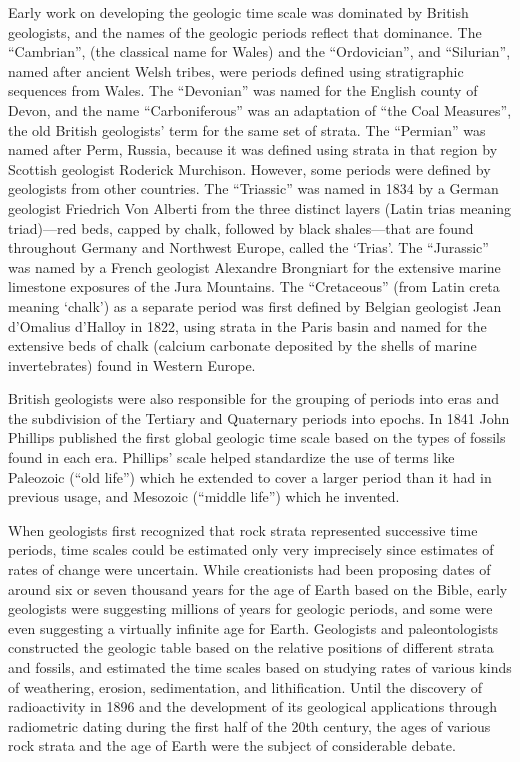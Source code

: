 \documentclass[]{book}
\theoremstyle{definition}
\theoremstyle{definition}
\theoremstyle{definition}
\theoremstyle{remark}
\begin{document}
\begin{enumerate}
Early work on developing the geologic time scale was dominated by
British geologists, and the names of the geologic periods reflect that
dominance. The ``Cambrian'', (the classical name for Wales) and the
``Ordovician'', and ``Silurian'', named after ancient Welsh tribes, were
periods defined using stratigraphic sequences from Wales. The
``Devonian'' was named for the English county of Devon, and the name
``Carboniferous'' was an adaptation of ``the Coal Measures'', the old
British geologists' term for the same set of strata. The ``Permian'' was
named after Perm, Russia, because it was defined using strata in that
region by Scottish geologist Roderick Murchison. However, some periods
were defined by geologists from other countries. The ``Triassic'' was
named in 1834 by a German geologist Friedrich Von Alberti from the three
distinct layers (Latin trias meaning triad)---red beds, capped by chalk,
followed by black shales---that are found throughout Germany and
Northwest Europe, called the `Trias'. The ``Jurassic'' was named by a
French geologist Alexandre Brongniart for the extensive marine limestone
exposures of the Jura Mountains. The ``Cretaceous'' (from Latin creta
meaning `chalk') as a separate period was first defined by Belgian
geologist Jean d'Omalius d'Halloy in 1822, using strata in the Paris
basin and named for the extensive beds of chalk (calcium carbonate
deposited by the shells of marine invertebrates) found in Western
Europe.

British geologists were also responsible for the grouping of periods
into eras and the subdivision of the Tertiary and Quaternary periods
into epochs. In 1841 John Phillips published the first global geologic
time scale based on the types of fossils found in each era. Phillips'
scale helped standardize the use of terms like Paleozoic (``old life'')
which he extended to cover a larger period than it had in previous
usage, and Mesozoic (``middle life'') which he invented.

When geologists first recognized that rock strata represented successive
time periods, time scales could be estimated only very imprecisely since
estimates of rates of change were uncertain. While creationists had been
proposing dates of around six or seven thousand years for the age of
Earth based on the Bible, early geologists were suggesting millions of
years for geologic periods, and some were even suggesting a virtually
infinite age for Earth. Geologists and paleontologists constructed the
geologic table based on the relative positions of different strata and
fossils, and estimated the time scales based on studying rates of
various kinds of weathering, erosion, sedimentation, and lithification.
Until the discovery of radioactivity in 1896 and the development of its
geological applications through radiometric dating during the first half
of the 20th century, the ages of various rock strata and the age of
Earth were the subject of considerable debate.


\end{enumerate}
\end{document}
